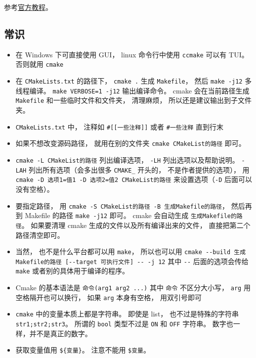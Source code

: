 


参考\href{https://cmake.org/cmake/help/latest/guide/tutorial/index.html}{官方教程}。

\subsection{常识}
\begin{itemize}
\item 在 Windows 下可直接使用 GUI， linux 命令行中使用 \verb`ccmake` 可以有 TUI。 否则就用 \verb`cmake`
\item 在 \verb|CMakeLists.txt| 的路径下， \verb`cmake .` 生成 \verb|Makefile|， 然后 \verb|make -j12| 多线程编译。 \verb|make VERBOSE=1 -j12| 输出编译命令。 cmake 会在当前路径生成 \verb|Makefile| 和一些临时文件和文件夹， 清理麻烦， 所以还是建议输出到子文件夹。
\item \verb|CMakeLists.txt| 中， 注释如 \verb|#[[一些注释]]| 或者 \verb|#一些注释| 直到行末
\item 如果不想改变源码路径， 就用在别的文件夹 \verb|cmake CMakeList的路径| 即可。
\item \verb|cmake -L CMakeList的路径| 列出编译选项， \verb|-LH| 列出选项以及帮助说明。 \verb|-LAH| 列出所有选项（会多出很多 \verb|CMAKE_| 开头的， 不是作者提供的选项）， 用 \verb|cmake -D 选项1=值1 -D 选项2=值2 CMakeList的路径| 来设置选项（\verb|-D| 后面可以没有空格）。
\item 要指定路径， 用 \verb|cmake -S CMakeList的路径 -B 生成Makefile的路径|， 然后再到 Makefile 的路径 \verb|make -j12| 即可。 cmake 会自动生成 \verb|生成Makefile的路径|。 如果要清理 cmake 生成的文件以及所有编译出来的文件， 直接把第二个路径清空即可。
\item 当然， 也不是什么平台都可以用 \verb|make|， 所以也可以用 \verb|cmake --build 生成Makefile的路径 [--target 可执行文件] -- -j 12| 其中 \verb|--| 后面的选项会传给 \verb|make| 或者别的具体用于编译的程序。
\item Cmake 的基本语法是 \verb`命令(arg1 arg2 ...)` 其中 \verb|命令| 不区分大小写， \verb`arg` 用空格隔开也可以换行， 如果 \verb|arg| 本身有空格， 用双引号即可
\item \verb|cmake| 中的变量本质上都是字符串。 即使是 list， 也不过是特殊的字符串 \verb|str1;str2;str3|。 所谓的 \verb|bool| 类型不过是 \verb|ON| 和 \verb|OFF| 字符串。 数字也一样，并不是真正的数字。
\item 获取变量值用 \verb`${变量}`。 注意不能用 \verb|$变量|。

\end{itemize}
